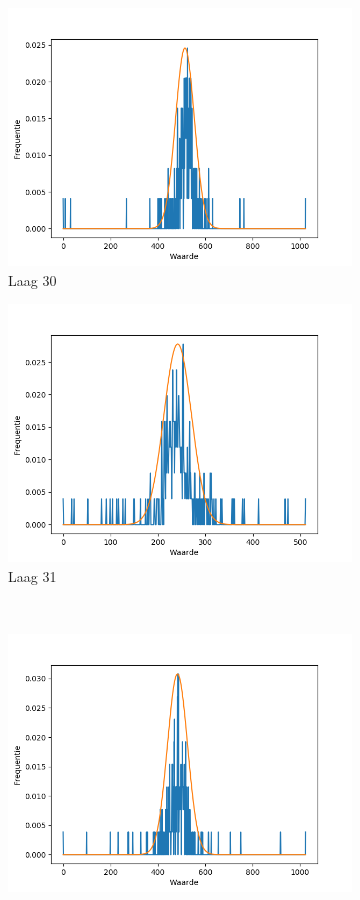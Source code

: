 \begin{itemize}
\begin{figure}[H]
\centering
\begin{subfigure}{0.44\textwidth}
  \centering
  \includegraphics[width=0.9\linewidth]{images/distribution_quantized_values_layer_30.png}
  \caption{Laag 30}
\end{subfigure}
\begin{subfigure}{.44\textwidth}
  \centering
  \includegraphics[width=0.9\linewidth]{images/distribution_quantized_values_layer_31.png}
  \caption{Laag 31}
\end{subfigure}
\\
\begin{subfigure}{.44\textwidth}
  \centering
  \includegraphics[width=0.9\linewidth]{images/distribution_quantized_values_layer_32.png}

\end{subfigure}
\end{figure}
\end{itemize}
